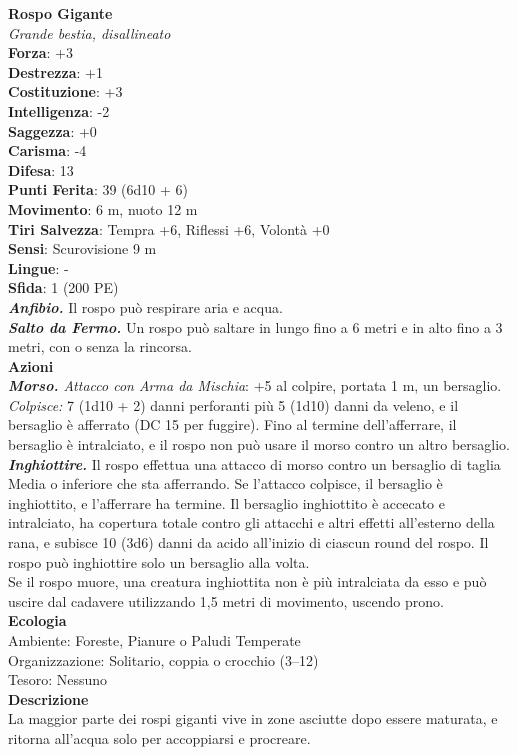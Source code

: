 \begin{multicols}{2}
\medskip\textbf{Rospo Gigante}\\
\emph{Grande bestia, disallineato}\\
\textbf{Forza}: +3\\
\textbf{Destrezza}: +1\\
\textbf{Costituzione}: +3\\
\textbf{Intelligenza}: -2\\
\textbf{Saggezza}: +0\\
\textbf{Carisma}: -4\\
\textbf{Difesa}: 13\\
\textbf{Punti Ferita}: 39 (6d10 + 6)\\
\textbf{Movimento}: 6 m, nuoto 12 m\\
\textbf{Tiri Salvezza}: Tempra +6, Riflessi +6, Volontà +0\\
\textbf{Sensi}: Scurovisione 9 m\\
\textbf{Lingue}: -\\
\textbf{Sfida}: 1 (200 PE)\smallskip\\
\emph{\textbf{Anfibio.}} Il rospo può respirare aria e acqua.\\
\emph{\textbf{Salto da Fermo.}} Un rospo può saltare in lungo fino a 6 metri e in alto fino a 3 metri, con o senza la rincorsa.\\
\smallskip\textbf{Azioni}\\
\emph{\textbf{Morso.} Attacco con Arma da Mischia}: +5 al colpire, portata 1 m, un bersaglio.\\

\emph{Colpisce:} 7 (1d10 + 2) danni perforanti più 5 (1d10) danni da veleno, e il bersaglio è afferrato (DC  15 per fuggire). Fino al termine dell'afferrare, il bersaglio è intralciato, e il rospo non può usare il morso contro un altro bersaglio.  \\
\emph{\textbf{Inghiottire.}} Il rospo effettua una attacco di morso contro un bersaglio di taglia Media o inferiore che sta afferrando. Se l'attacco colpisce, il bersaglio è inghiottito, e l'afferrare ha termine. Il bersaglio inghiottito è accecato e intralciato, ha copertura totale contro gli attacchi e altri effetti all'esterno della rana, e subisce 10 (3d6) danni da acido all'inizio di ciascun round del rospo. Il rospo può inghiottire solo un bersaglio alla volta.\\
Se il rospo muore, una creatura inghiottita non è più intralciata da esso e può uscire dal cadavere utilizzando 1,5 metri di movimento, uscendo prono.\\
\textbf{Ecologia}\\
Ambiente: Foreste, Pianure o Paludi Temperate\\
Organizzazione: Solitario, coppia o crocchio (3–12)\\
Tesoro: Nessuno\\
\textbf{Descrizione}\\
La maggior parte dei rospi giganti vive in zone asciutte dopo essere maturata, e ritorna all'acqua solo per accoppiarsi e procreare.\\


\end{multicols}
